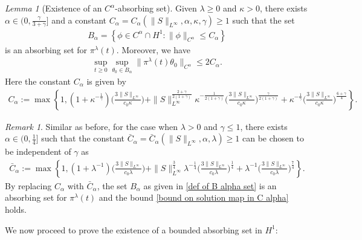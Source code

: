 \documentclass[reqno]{amsart}%
\theoremstyle{definition}
\theoremstyle{remark}
\numberwithin{equation}{section}
\newtheorem{lemma}[theorem]{Lemma}
\newtheorem{remark}[theorem]{Remark}
\newcommand{\1}{\mathbf{1}}
\newcommand{\pin}{\pi^{\lambda}}
\numberwithin{equation}{section}
\numberwithin{theorem}{section}
\numberwithin{figure}{section}
\begin{document}
\begin{lemma}[Existence of an $C^\alpha$-absorbing set]\label{Existence of an C alpha absorbing set lemma}
Given $\lambda\ge0$ and $\kappa>0$, there exists $\alpha\in(0,\frac{\gamma}{3+\gamma}]$ and a constant $C_{\alpha}=C_{\alpha}(\|S\|_{L^\infty},\alpha,\kappa,\gamma)\ge1$ such that the set
\begin{align}\label{def of B alpha set}
B_{\alpha}=\left\{\phi\in C^{\alpha}\cap H^1:\|\phi\|_{C^\alpha}\le C_{\alpha}\right\}
\end{align}
is an absorbing set for $\pin(t)$. Moreover, we have
\begin{align}\label{bound on solution map in C alpha}
\sup_{t\ge0}\sup_{\theta_0\in B_{\alpha}}\|\pin(t)\theta_0\|_{C^\alpha}\le 2C_{\alpha}.
\end{align}
Here the constant $C_\alpha$ is given by
{\footnotesize
\begin{align*}
C_\alpha:=\max\left\{1,(1+\kappa^{-\frac{1}{\gamma}})\Big(\frac{3\|S\|_{L^\infty}}{c_0\kappa}\Big)+\|S\|^\frac{2+\gamma}{2(1+\gamma)}_{L^\infty}\kappa^{-\frac{1}{2(1+\gamma)}}\Big(\frac{3\|S\|_{L^\infty}}{c_0\kappa}\Big)^{\frac{\gamma}{2(1+\gamma)}}+\kappa^{-\frac{1}{\gamma}}\Big(\frac{3\|S\|_{L^\infty}}{c_0\kappa}\Big)^{\frac{6+\gamma}{4}}\right\}.
\end{align*}
}
\end{lemma}

\begin{remark}\label{Existence of an C alpha absorbing set remark}
Similar as before, for the case when $\lambda>0$ and $\gamma\le1$, there exists $\alpha\in(0,\frac{1}{4}]$ such that the constant $\bar{C}_\alpha=\bar{C}_{\alpha}(\|S\|_{L^\infty},\alpha,\lambda)\ge1$ can be chosen to be independent of $\gamma$ as 
\begin{align*}
\bar{C}_\alpha:=\max\left\{1,(1+\lambda^{-1})\Big(\frac{3\|S\|_{L^\infty}}{c_0\lambda}\Big)+\|S\|^\frac{3}{4}_{L^\infty}\lambda^{-\frac{1}{4}}\Big(\frac{3\|S\|_{L^\infty}}{c_0\lambda}\Big)^{\frac{1}{4}}+\lambda^{-1}\Big(\frac{3\|S\|_{L^\infty}}{c_0\lambda}\Big)^{\frac{7}{4}}\right\}.
\end{align*}
By replacing $C_\alpha$ with $\bar{C}_\alpha$, the set $B_\alpha$ as given in \eqref{def of B alpha set} is an absorbing set for $\pin(t)$ and the bound \eqref{bound on solution map in C alpha} holds. 
\end{remark}

We now proceed to prove the existence of a bounded absorbing set in $H^1$:
\end{document}

